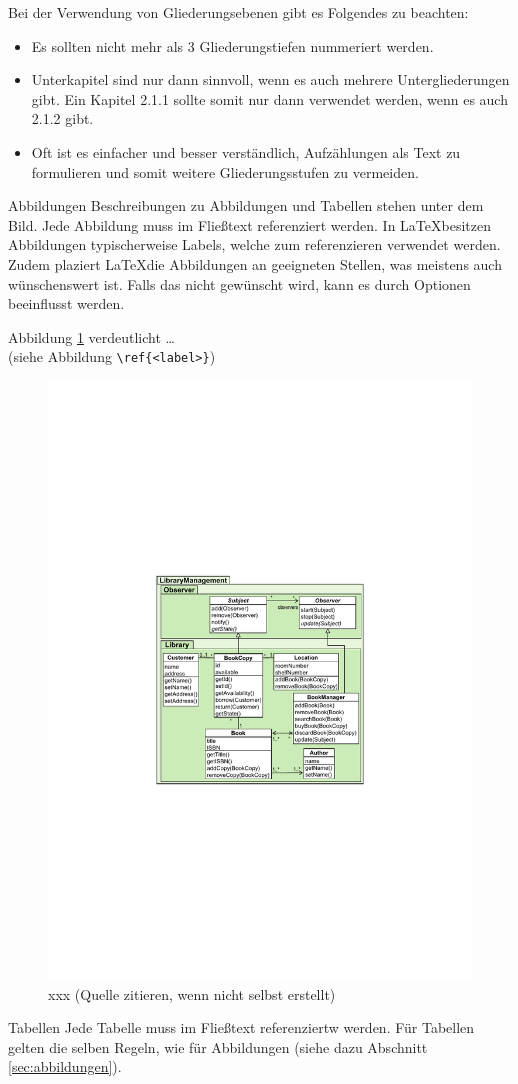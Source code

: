 Bei der Verwendung von Gliederungsebenen gibt es Folgendes zu beachten:
\begin{itemize}
	\item Es sollten nicht mehr als 3 Gliederungstiefen nummeriert werden.
	\item Unterkapitel sind nur dann sinnvoll, wenn es auch mehrere Untergliederungen gibt. Ein Kapitel 2.1.1 sollte somit nur dann verwendet werden, wenn es auch 2.1.2 gibt.
	\item Oft ist es einfacher und besser verständlich, Aufzählungen als Text zu formulieren und somit weitere Gliederungsstufen zu vermeiden.
\end{itemize}

Abbildungen
Beschreibungen zu Abbildungen und Tabellen stehen unter dem Bild. Jede Abbildung muss im Fließtext referenziert werden. In \LaTeX besitzen Abbildungen typischerweise Labels, welche zum referenzieren verwendet werden. Zudem plaziert \LaTeX die Abbildungen an geeigneten Stellen, was meistens auch wünschenswert ist. Falls das nicht gewünscht wird, kann es durch Optionen beeinflusst werden.

Abbildung \ref{fig:xxx} verdeutlicht  \dots\\
(siehe Abbildung \verb|\ref{<label>}|)

\begin{figure}
	\centering
	\includegraphics[width=0.4\linewidth]{figures/figure1}
	\caption{xxx (Quelle zitieren, wenn nicht selbst erstellt)}
	\label{fig:xxx}
\end{figure}
Tabellen
Jede Tabelle muss im Fließtext referenziertw werden. Für Tabellen gelten die selben Regeln, wie für Abbildungen (siehe dazu Abschnitt \ref{sec:abbildungen}).

